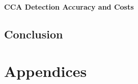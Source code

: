 \documentclass[twoside,hidelinks]{glasgowthesis}
\begin{document}
\subsection{CCA Detection Accuracy and Costs}



\chapter{Conclusion}


\part{Appendices}
\appendix



\newpage


\renewcommand*{\mkbibnamefamily}[1]{\textsc{#1}}
\renewcommand*{\mkbibnameprefix}[1]{\textsc{#1}}
\printbibliography[title={References}]
\end{document}
